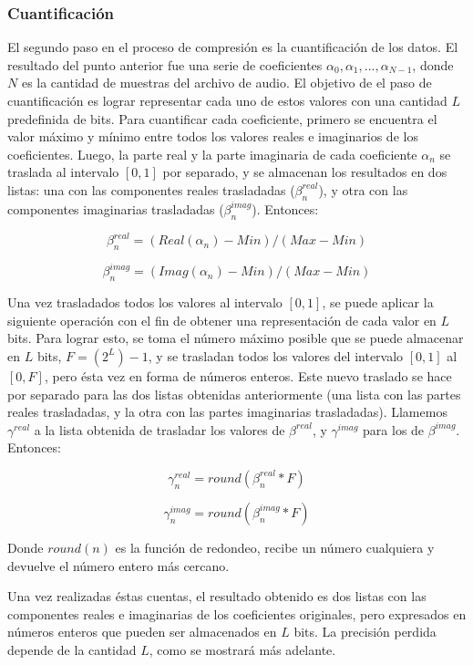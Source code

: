 \documentclass[12pt,a4paper]{article}
\begin{document}
\subsubsection{Cuantificación}

      El segundo paso en el proceso de compresión es la cuantificación de los datos.  El resultado del punto anterior fue una serie de coeficientes $\alpha_0, \alpha_1, ..., \alpha_{N-1}$, donde $N$ es la cantidad de muestras del archivo de audio.  El objetivo de el paso de cuantificación es lograr representar cada uno de estos valores con una cantidad $L$ predefinida de bits.  Para cuantificar cada coeficiente, primero se encuentra el valor máximo y mínimo entre todos los valores reales e imaginarios de los coeficientes.  Luego, la parte real y la parte imaginaria de cada coeficiente $\alpha_n$ se traslada al intervalo $[0, 1]$ por separado, y se almacenan los resultados en dos listas: una con las componentes reales trasladadas ($\beta^{real}_n$), y otra con las componentes imaginarias trasladadas ($\beta^{imag}_n$).  Entonces:

$$\beta^{real}_n = (Real(\alpha_n) - Min) / (Max - Min)$$

$$\beta^{imag}_n = (Imag(\alpha_n) - Min) / (Max - Min)$$

  Una vez trasladados todos los valores al intervalo $[0, 1]$, se puede aplicar la siguiente operación con el fin de obtener una representación de cada valor en $L$ bits.  Para lograr esto, se toma el número máximo posible que se puede almacenar en $L$ bits, $F = (2^L)-1$, y se trasladan todos los valores del intervalo $[0, 1]$ al $[0, F]$, pero ésta vez en forma de números enteros.  Este nuevo traslado se hace por separado para las dos listas obtenidas anteriormente (una lista con las partes reales trasladadas, y la otra con las partes imaginarias trasladadas).  Llamemos $\gamma^{real}$ a la lista obtenida de trasladar los valores de $\beta^{real}$, y $\gamma^{imag}$ para los de $\beta^{imag}$.  Entonces:

$$ \gamma^{real}_n = round(\beta^{real}_n * F) $$

$$ \gamma^{imag}_n = round(\beta^{imag}_n * F) $$

  Donde $round(n)$ es la función de redondeo, recibe un número cualquiera y devuelve el número entero más cercano.

  Una vez realizadas éstas cuentas, el resultado obtenido es dos listas con las componentes reales e imaginarias de los coeficientes originales, pero expresados en números enteros que pueden ser almacenados en $L$ bits.  La precisión perdida depende de la cantidad $L$, como se mostrará más adelante.
\end{document}
